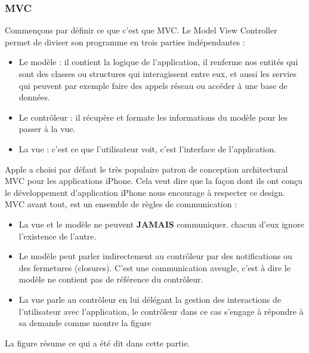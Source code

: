 \subsubsection{MVC} %
 \label{ssub:mvc}
 Commençons par définir ce que c'est que MVC. Le Model View Controller permet de diviser son programme en trois parties indépendantes :
 \begin{itemize}
 	\item Le modèle : il contient la logique de l'application, il renferme nos entités qui sont des classes ou structures qui interagissent entre eux, et aussi les servies qui peuvent par exemple faire des appels réseau ou accéder à une base de données.
 	\item Le contrôleur : il récupère  et formate les informations du modèle pour les passer à la vue.
 	\item La vue : c'est ce que l'utilisateur voit, c'est l'interface de l'application.
 \end{itemize}
 Apple a choisi par défaut le très populaire patron de conception architectural MVC pour les applications iPhone. Cela veut dire que la façon dont ils ont conçu le développement d'application iPhone nous encourage à respecter ce design. \newline
 MVC avant tout, est un ensemble de règles de communication :
 \begin{itemize}
 	\item La vue et le modèle ne peuvent \textbf{JAMAIS} communiquer. chacun d'eux ignore l’existence de l'autre.
 	\item Le modèle peut parler indirectement au contrôleur par des notifications ou des fermetures (closures). C'est une communication aveugle, c'est à dire le modèle ne contient pas de référence du contrôleur.
 	\item La vue parle au contrôleur en lui délégant la gestion des interactions de l'utilisateur avec l'application, le contrôleur dans ce cas s'engage à répondre à sa demande comme montre la figure 
 	\newline
 \end{itemize}
 La figure résume ce qui a été dit dans cette partie.

